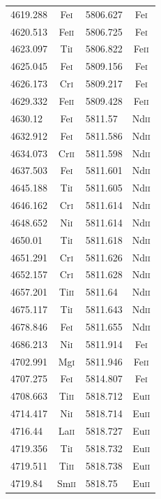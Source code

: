\begin{longtable}[c]{|l|c|l|c|}
4619.288 & Fe\textsc{i} & 5806.627 & Fe\textsc{i}\\  
4620.513 & Fe\textsc{ii} & 5806.725 & Fe\textsc{i}\\ 
4623.097 & Ti\textsc{i} & 5806.822 & Fe\textsc{ii}\\ 
4625.045 & Fe\textsc{i} & 5809.156 & Fe\textsc{i}\\  
4626.173 & Cr\textsc{i} & 5809.217 & Fe\textsc{i}\\  
4629.332 & Fe\textsc{ii} & 5809.428 & Fe\textsc{ii}\\
4630.12 & Fe\textsc{i} & 5811.57 & Nd\textsc{ii}\\   
4632.912 & Fe\textsc{i} & 5811.586 & Nd\textsc{ii}\\ 
4634.073 & Cr\textsc{ii} & 5811.598 & Nd\textsc{ii}\\
4637.503 & Fe\textsc{i} & 5811.601 & Nd\textsc{ii}\\ 
4645.188 & Ti\textsc{i} & 5811.605 & Nd\textsc{ii}\\ 
4646.162 & Cr\textsc{i} & 5811.614 & Nd\textsc{ii}\\ 
4648.652 & Ni\textsc{i} & 5811.614 & Nd\textsc{ii}\\ 
4650.01 & Ti\textsc{i} & 5811.618 & Nd\textsc{ii}\\  
4651.291 & Cr\textsc{i} & 5811.626 & Nd\textsc{ii}\\ 
4652.157 & Cr\textsc{i} & 5811.628 & Nd\textsc{ii}\\ 
4657.201 & Ti\textsc{ii} & 5811.64 & Nd\textsc{ii}\\ 
4675.117 & Ti\textsc{i} & 5811.643 & Nd\textsc{ii}\\ 
4678.846 & Fe\textsc{i} & 5811.655 & Nd\textsc{ii}\\ 
4686.213 & Ni\textsc{i} & 5811.914 & Fe\textsc{i}\\  
4702.991 & Mg\textsc{i} & 5811.946 & Fe\textsc{ii}\\ 
4707.275 & Fe\textsc{i} & 5814.807 & Fe\textsc{i}\\  
4708.663 & Ti\textsc{ii} & 5818.712 & Eu\textsc{ii}\\
4714.417 & Ni\textsc{i} & 5818.714 & Eu\textsc{ii}\\ 
4716.44 & La\textsc{ii} & 5818.727 & Eu\textsc{ii}\\ 
4719.356 & Ti\textsc{i} & 5818.732 & Eu\textsc{ii}\\ 
4719.511 & Ti\textsc{ii} & 5818.738 & Eu\textsc{ii}\\
4719.84 & Sm\textsc{ii} & 5818.75 & Eu\textsc{ii}\\  

\end{longtable}
